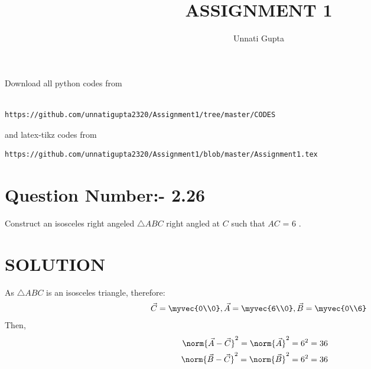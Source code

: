 \documentclass[journal,12pt,twocolumn]{IEEEtran}
\begin{document}
\title{ASSIGNMENT 1}
\author{Unnati Gupta}

\maketitle
\newpage

\bigskip
\renewcommand{\thefigure}{\theenumi}
\renewcommand{\thetable}{\theenumi}
Download all python codes from 
\begin{lstlisting}

https://github.com/unnatigupta2320/Assignment1/tree/master/CODES
\end{lstlisting}
%
and latex-tikz codes from 
%
\begin{lstlisting}
https://github.com/unnatigupta2320/Assignment1/blob/master/Assignment1.tex
\end{lstlisting}
%
\section{Question Number:- 2.26}
Construct an isosceles right angeled $\triangle ABC$  right angled at $C$ such that 
$AC$ = 6 .
%
\section{SOLUTION}
As $\triangle ABC$ is an isosceles triangle, therefore:
\begin{align}
\vec{C} = \myvec{0\\0},
\vec{A} = \myvec{6\\0}, 
\vec{B} = \myvec{0\\6}
\end{align}
Then,
\begin{align}
\norm{\vec{A}-\vec{C}}^2 = \norm{\vec{A}}^2 =6^2=36   \quad 
\\
\norm{\vec{B}-\vec{C}}^2 = \norm{\vec{B}}^2 =6^2=36 \quad 
\end{align}
\end{document}
